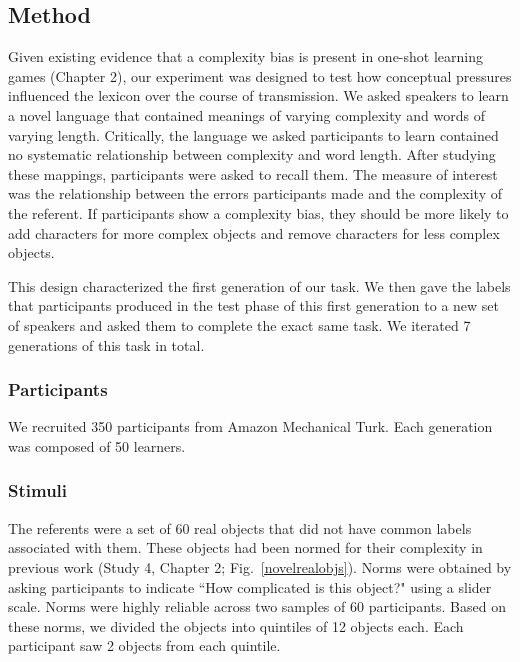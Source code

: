 \subsection{Method}

Given existing evidence that a complexity bias is present in one-shot learning games (Chapter 2),  our experiment was designed to test how conceptual pressures influenced the lexicon over the course of transmission. We asked speakers to learn a novel language that contained meanings of varying complexity and words of varying length. Critically, the language we asked participants to learn contained no systematic relationship between complexity and word length. After studying these mappings, participants were asked to recall them. The measure of interest was the relationship between the errors participants made and the complexity of the referent. If participants show a complexity bias, they should be more likely to add characters for more complex objects and remove characters for less complex objects. 

This design characterized the first generation of our task. We then gave the labels that participants produced in the test phase of this first generation to a new set of speakers and asked them to complete the exact same task. We iterated 7 generations of this task in total.


\subsubsection{Participants} 

We recruited 350 participants from Amazon Mechanical Turk. Each generation was composed of 50 learners.

\subsubsection{Stimuli}

The referents were a set of 60 real objects that did not have common labels associated with them. These objects had been normed for their complexity in previous work (Study 4, Chapter 2; Fig.\ \ref{novelrealobjs}). Norms were obtained by asking participants to indicate ``How complicated is this object?" using a slider scale. Norms were highly reliable across two samples of 60 participants. Based on these norms, we divided the objects into quintiles of 12 objects each. Each participant saw 2 objects from each quintile. 




